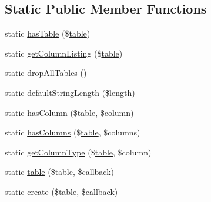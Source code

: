 \subsection*{Static Public Member Functions}
\begin{DoxyCompactItemize}
\item 
static \mbox{\hyperlink{class_illuminate_1_1_support_1_1_facades_1_1_schema_ab3eb87828d516be4c1ab7b6ffa210535}{has\+Table}} (\$\mbox{\hyperlink{class_illuminate_1_1_support_1_1_facades_1_1_schema_ad6ab62c6365903825576c7725ae5d113}{table}})
\item 
static \mbox{\hyperlink{class_illuminate_1_1_support_1_1_facades_1_1_schema_a67297524d55f7ff497d18a1257cd7d93}{get\+Column\+Listing}} (\$\mbox{\hyperlink{class_illuminate_1_1_support_1_1_facades_1_1_schema_ad6ab62c6365903825576c7725ae5d113}{table}})
\item 
static \mbox{\hyperlink{class_illuminate_1_1_support_1_1_facades_1_1_schema_aba1322ae1492008b3c4aac5329e2c9b1}{drop\+All\+Tables}} ()
\item 
static \mbox{\hyperlink{class_illuminate_1_1_support_1_1_facades_1_1_schema_af0f89e8cb357d537bc37ec11e2acdcf1}{default\+String\+Length}} (\$length)
\item 
static \mbox{\hyperlink{class_illuminate_1_1_support_1_1_facades_1_1_schema_a8cf7b6e85875f8a1d7ea636d3dc4a31e}{has\+Column}} (\$\mbox{\hyperlink{class_illuminate_1_1_support_1_1_facades_1_1_schema_ad6ab62c6365903825576c7725ae5d113}{table}}, \$column)
\item 
static \mbox{\hyperlink{class_illuminate_1_1_support_1_1_facades_1_1_schema_a847e88acdd9b146424f7f02fa5349eed}{has\+Columns}} (\$\mbox{\hyperlink{class_illuminate_1_1_support_1_1_facades_1_1_schema_ad6ab62c6365903825576c7725ae5d113}{table}}, \$columns)
\item 
static \mbox{\hyperlink{class_illuminate_1_1_support_1_1_facades_1_1_schema_afdab112ef809a4560c95491d1d5bf350}{get\+Column\+Type}} (\$\mbox{\hyperlink{class_illuminate_1_1_support_1_1_facades_1_1_schema_ad6ab62c6365903825576c7725ae5d113}{table}}, \$column)
\item 
static \mbox{\hyperlink{class_illuminate_1_1_support_1_1_facades_1_1_schema_ad6ab62c6365903825576c7725ae5d113}{table}} (\$table, \$callback)
\item 
static \mbox{\hyperlink{class_illuminate_1_1_support_1_1_facades_1_1_schema_aaedf192bb16a90e78f51dbd7a0a3ba81}{create}} (\$\mbox{\hyperlink{class_illuminate_1_1_support_1_1_facades_1_1_schema_ad6ab62c6365903825576c7725ae5d113}{table}}, \$callback)

\end{DoxyCompactItemize}
